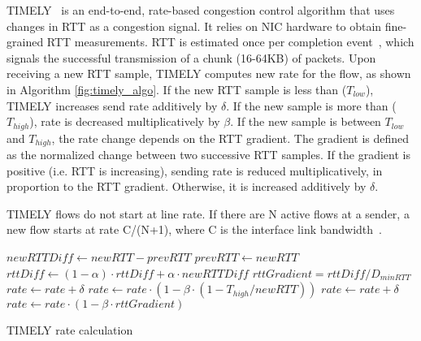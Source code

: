 TIMELY~\cite{timely} is an end-to-end, rate-based congestion control algorithm
that uses changes in RTT as a congestion signal.  It relies on NIC hardware to
obtain fine-grained RTT measurements. RTT is estimated once per completion
event~\cite{rocev2}, which signals the successful transmission of a chunk
(16-64KB) of packets. Upon receiving a new RTT sample, TIMELY computes new rate
for the flow, as shown in Algorithm \ref{fig:timely_algo}.  If the new RTT
sample is less than ($T_{low}$), TIMELY increases send rate additively by
$\delta$. If the new sample is more than ($T_{high}$), rate is decreased
multiplicatively by $\beta$. If the new sample is between $T_{low}$ and
$T_{high}$, the rate change depends on the RTT gradient. The gradient is defined
as the normalized change between two successive RTT samples. If the gradient is
positive (i.e. RTT is increasing), sending rate is reduced multiplicatively, in
proportion to the RTT gradient.  Otherwise, it is increased additively by
$\delta$.

TIMELY flows do not start at line rate. If there are N active flows at a sender,
a new flow starts at rate C/(N+1), where C is the interface link
bandwidth~\cite{timely}.

\begin{algorithm}[t]
\footnotesize
{
\begin{algorithmic}[1]
\State $newRTTDiff \gets newRTT - prevRTT$
\State $prevRTT \gets newRTT$
\State $rttDiff \gets (1-\alpha) \cdot rttDiff + \alpha \cdot newRTTDiff$
\State $rttGradient = rttDiff/D_{minRTT}$
        \State $rate \gets rate + \delta$
        \State $rate \gets rate \cdot  (1 - \beta \cdot (1 - T_{high}/newRTT))$
        \State $rate \gets rate + \delta$
\Else
        \State $rate \gets rate \cdot (1 - \beta \cdot rttGradient)$
\EndIf 
\end{algorithmic}
}
\caption{TIMELY rate calculation}
\label{fig:timely_algo}
\end{algorithm}
